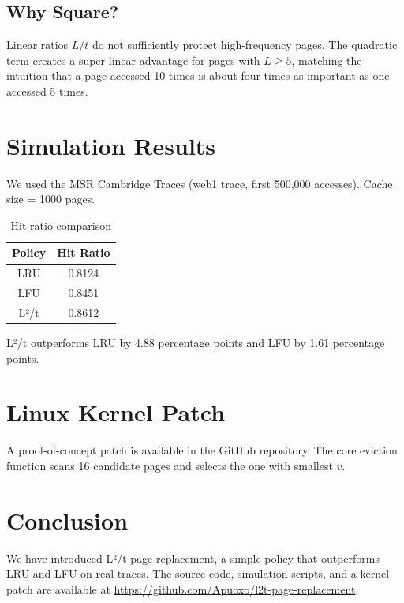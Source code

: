 \documentclass[12pt,a4paper]{article}
\begin{document}
\subsection{Why Square?}
Linear ratios \(L/t\) do not sufficiently protect high-frequency pages. The quadratic term creates a super-linear advantage for pages with \(L \ge 5\), matching the intuition that a page accessed 10 times is about four times as important as one accessed 5 times.

\section{Simulation Results}
We used the MSR Cambridge Traces (web1 trace, first 500,000 accesses). Cache size = 1000 pages.

\begin{table}[h]
\centering
\caption{Hit ratio comparison}
\begin{tabular}{|c|c|}
\hline
\textbf{Policy} & \textbf{Hit Ratio} \\
\hline
LRU  & 0.8124 \\
LFU  & 0.8451 \\
L²/t & 0.8612 \\
\hline
\end{tabular}
\end{table}

L²/t outperforms LRU by 4.88 percentage points and LFU by 1.61 percentage points.

\section{Linux Kernel Patch}
A proof-of-concept patch is available in the GitHub repository. The core eviction function scans 16 candidate pages and selects the one with smallest \(v\).

\section{Conclusion}
We have introduced L²/t page replacement, a simple policy that outperforms LRU and LFU on real traces. The source code, simulation scripts, and a kernel patch are available at \url{https://github.com/Apuoxo/l2t-page-replacement}.
\end{document}

